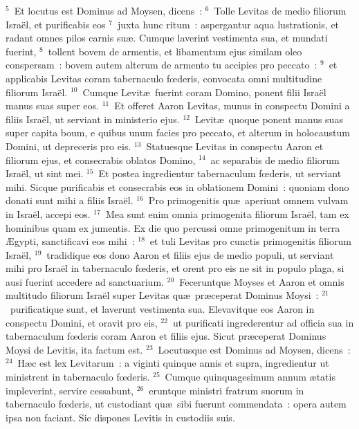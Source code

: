 ${}^{5}$~Et locutus est Dominus ad Moysen, dicens~:
${}^{6}$~Tolle Levitas de medio filiorum Isra\"el, et purificabis eos
${}^{7}$~juxta hunc ritum~: aspergantur aqua lustrationis, et radant omnes pilos carnis su\ae . Cumque laverint vestimenta sua, et mundati fuerint,
${}^{8}$~tollent bovem de armentis, et libamentum ejus similam oleo conspersam~: bovem autem alterum de armento tu accipies pro peccato~:
${}^{9}$~et applicabis Levitas coram tabernaculo fœderis, convocata omni multitudine filiorum Isra\"el.
${}^{10}$~Cumque Levit\ae\ fuerint coram Domino, ponent filii Isra\"el manus suas super eos.
${}^{11}$~Et offeret Aaron Levitas, munus in conspectu Domini a filiis Isra\"el, ut serviant in ministerio ejus.
${}^{12}$~Levit\ae\ quoque ponent manus suas super capita boum, e quibus unum facies pro peccato, et alterum in holocaustum Domini, ut depreceris pro eis.
${}^{13}$~Statuesque Levitas in conspectu Aaron et filiorum ejus, et consecrabis oblatos Domino,
${}^{14}$~ac separabis de medio filiorum Isra\"el, ut sint mei.
${}^{15}$~Et postea ingredientur tabernaculum fœderis, ut serviant mihi. Sicque purificabis et consecrabis eos in oblationem Domini~: quoniam dono donati sunt mihi a filiis Isra\"el.
${}^{16}$~Pro primogenitis qu\ae\ aperiunt omnem vulvam in Isra\"el, accepi eos.
${}^{17}$~Mea sunt enim omnia primogenita filiorum Isra\"el, tam ex hominibus quam ex jumentis. Ex die quo percussi omne primogenitum in terra \AE gypti, sanctificavi eos mihi~:
${}^{18}$~et tuli Levitas pro cunctis primogenitis filiorum Isra\"el,
${}^{19}$~tradidique eos dono Aaron et filiis ejus de medio populi, ut serviant mihi pro Isra\"el in tabernaculo fœderis, et orent pro eis ne sit in populo plaga, si ausi fuerint accedere ad sanctuarium.
${}^{20}$~Feceruntque Moyses et Aaron et omnis multitudo filiorum Isra\"el super Levitas qu\ae\ pr\ae ceperat Dominus Moysi~:
${}^{21}$~purificatique sunt, et laverunt vestimenta sua. Elevavitque eos Aaron in conspectu Domini, et oravit pro eis,
${}^{22}$~ut purificati ingrederentur ad officia sua in tabernaculum fœderis coram Aaron et filiis ejus. Sicut pr\ae ceperat Dominus Moysi de Levitis, ita factum est.
${}^{23}$~Locutusque est Dominus ad Moysen, dicens~:
${}^{24}$~H\ae c est lex Levitarum~: a viginti quinque annis et supra, ingredientur ut ministrent in tabernaculo fœderis.
${}^{25}$~Cumque quinquagesimum annum \ae tatis impleverint, servire cessabunt,
${}^{26}$~eruntque ministri fratrum suorum in tabernaculo fœderis, ut custodiant qu\ae\ sibi fuerunt commendata~: opera autem ipsa non faciant. Sic dispones Levitis in custodiis suis.
